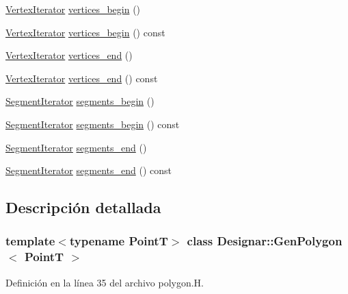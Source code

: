 \begin{DoxyCompactItemize}
\item 
\hyperlink{class_designar_1_1_gen_polygon_1_1_vertex_iterator}{Vertex\+Iterator} \hyperlink{class_designar_1_1_gen_polygon_a46604941ab9b33349086f7ca4b222869}{vertices\+\_\+begin} ()
\item 
\hyperlink{class_designar_1_1_gen_polygon_1_1_vertex_iterator}{Vertex\+Iterator} \hyperlink{class_designar_1_1_gen_polygon_a1a2dd20f7312fcba7649263f77e9f649}{vertices\+\_\+begin} () const
\item 
\hyperlink{class_designar_1_1_gen_polygon_1_1_vertex_iterator}{Vertex\+Iterator} \hyperlink{class_designar_1_1_gen_polygon_aad1c6e27b6288072e2821c65512ba2a4}{vertices\+\_\+end} ()
\item 
\hyperlink{class_designar_1_1_gen_polygon_1_1_vertex_iterator}{Vertex\+Iterator} \hyperlink{class_designar_1_1_gen_polygon_ad409613d032d91895921d60e27250a14}{vertices\+\_\+end} () const
\item 
\hyperlink{class_designar_1_1_gen_polygon_1_1_segment_iterator}{Segment\+Iterator} \hyperlink{class_designar_1_1_gen_polygon_a6957491e673b75a7106de2a19dd20f2e}{segments\+\_\+begin} ()
\item 
\hyperlink{class_designar_1_1_gen_polygon_1_1_segment_iterator}{Segment\+Iterator} \hyperlink{class_designar_1_1_gen_polygon_a66bce31d11cd12f7f3d6731d3d23bb77}{segments\+\_\+begin} () const
\item 
\hyperlink{class_designar_1_1_gen_polygon_1_1_segment_iterator}{Segment\+Iterator} \hyperlink{class_designar_1_1_gen_polygon_a1812e03e19df8a1363989b271955ea66}{segments\+\_\+end} ()
\item 
\hyperlink{class_designar_1_1_gen_polygon_1_1_segment_iterator}{Segment\+Iterator} \hyperlink{class_designar_1_1_gen_polygon_aa8e70075cae9a4a726bc8635d2cd527b}{segments\+\_\+end} () const
\end{DoxyCompactItemize}


\subsection{Descripción detallada}
\subsubsection*{template$<$typename PointT$>$\newline
class Designar\+::\+Gen\+Polygon$<$ Point\+T $>$}



Definición en la línea 35 del archivo polygon.\+H.



